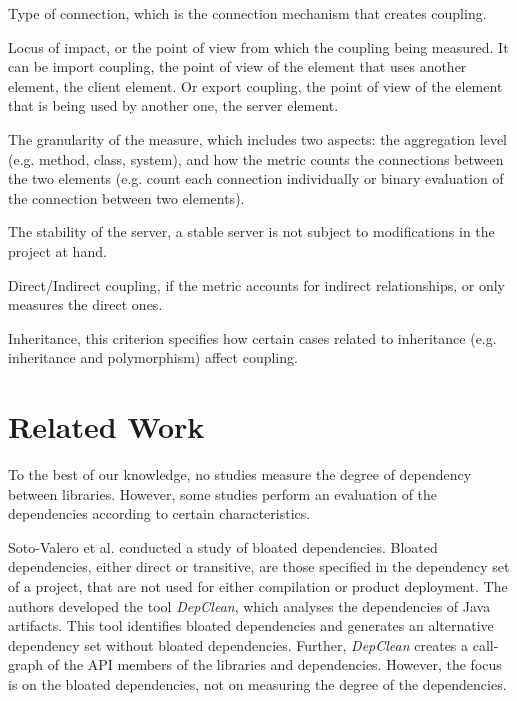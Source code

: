 \documentclass[a4paper]{article}
\begin{document}
\begin{description}[noitemsep,leftmargin=*]
    \item [Criterion 1:] Type of connection, which is the connection mechanism that creates coupling.
    \item [Criterion 2:] Locus of impact, or the point of view from which the coupling being measured. It can be import coupling, the point of view of the element that uses another element, the client element. Or export coupling, the point of view of the element that is being used by another one, the server element.
    \item[Criterion 3:] The granularity of the measure, which includes two aspects: the aggregation level (e.g. method, class, system), and how the metric counts the connections between the two elements (e.g. count each connection individually or binary evaluation of the connection between two elements).
    \item [Criterion 4:] The stability of the server, a stable server is not subject to modifications in the project at hand.
    \item [Criterion 5:] Direct/Indirect coupling, if the metric accounts for indirect relationships, or only measures the direct ones.
    \item [Criterion 6:] Inheritance, this criterion specifies how certain cases related to inheritance (e.g. inheritance and polymorphism) affect coupling.
\end{description}

\section{Related Work}
To the best of our knowledge, no studies measure the degree of dependency between libraries. However, some studies perform an evaluation of the dependencies according to certain characteristics.

Soto-Valero et al. \cite{soto2020comprehensive} conducted a study of bloated dependencies. Bloated dependencies, either direct or transitive, are those specified in the dependency set of a project, that are not used for either compilation or product deployment. The authors developed the tool \textit{DepClean}, which analyses the dependencies of Java artifacts. This tool identifies bloated dependencies and generates an alternative dependency set without bloated dependencies. Further, \textit{DepClean} creates a call-graph of the API members of the libraries and dependencies. However, the focus is on the bloated dependencies, not on measuring the degree of the dependencies.
\end{document}
